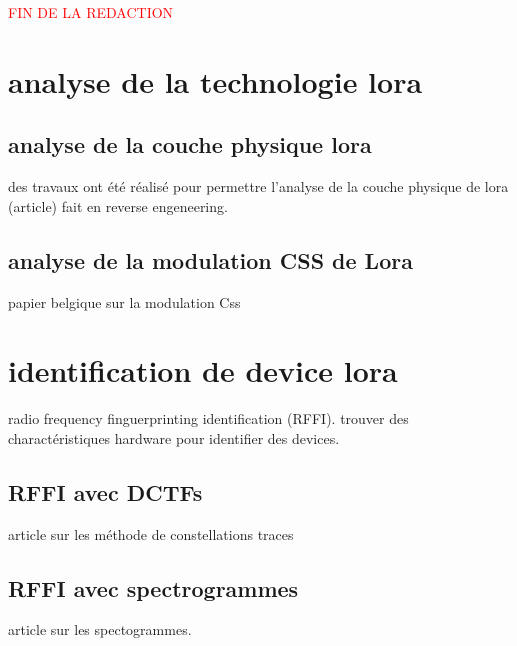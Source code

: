 \textcolor{red}{FIN DE LA REDACTION}

\section{analyse de la technologie lora}

\subsection{analyse de la couche physique lora}

des travaux ont été réalisé pour permettre l'analyse de la couche physique de lora (article)
fait en reverse engeneering. 

\subsection{analyse de la modulation CSS de Lora}

papier belgique sur la modulation Css

\section{identification de device lora}

radio frequency finguerprinting identification (RFFI). trouver des charactéristiques hardware pour identifier des devices.

\subsection{RFFI avec DCTFs}
article sur les méthode de constellations traces

\subsection{RFFI avec spectrogrammes}
article sur les spectogrammes.
